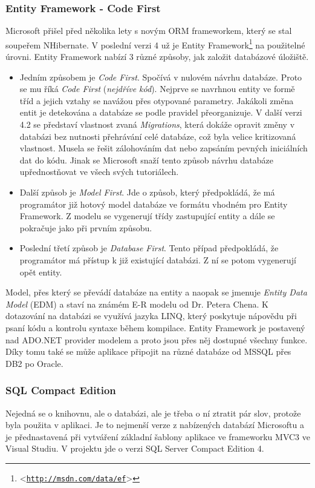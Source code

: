 \documentclass[11pt,twoside,a4paper]{book}
\let\oldUrl\url
\renewcommand\url[1]{<\texttt{\oldUrl{#1}}>}
\begin{document}
\subsubsection{Entity Framework - Code First}
\label{sec:ef}
Microsoft přišel před několika lety s novým ORM frameworkem, který se stal soupeřem NHibernate. V poslední verzi 4 už je Entity Framework\footnote{\url{http://msdn.com/data/ef}} na použitelné úrovni. Entity Framework nabízí 3 různé způsoby, jak založit databázové úložiště. 

\begin{itemize}
\item Jedním způsobem je \textit{Code First}. Spočívá v nulovém návrhu databáze. Proto se mu říká \textit{Code First} (\textit{nejdříve kód}). Nejprve se navrhnou entity ve formě tříd a jejich vztahy se navážou přes otypované parametry. Jakákoli změna entit je detekována a databáze se podle pravidel přeorganizuje. V další verzi 4.2 se představí vlastnost zvaná \textit{Migrations}, která dokáže opravit změny v databázi bez nutnosti přehrávání celé databáze, což byla velice kritizovaná vlastnost. Musela se řešit zálohováním dat nebo zapsáním pevných iniciálních dat do kódu. Jinak se Microsoft snaží tento způsob návrhu databáze upřednostňovat ve všech svých tutoriálech.

\item Další způsob je \textit{Model First}. Jde o způsob, který předpokládá, že má programátor již hotový model databáze ve formátu vhodném pro Entity Framework. Z modelu se vygenerují třídy zastupující entity a dále se pokračuje jako při prvním způsobu. 

\item Poslední třetí způsob je \textit{Database First}. Tento případ předpokládá, že programátor má přístup k již existující databázi. Z ní se potom vygenerují opět entity.

\end{itemize}

Model, přes který se převádí databáze na entity a naopak se jmenuje \textit{Entity Data Model} (EDM) a staví na známém E-R modelu od Dr. Petera Chena. K dotazování na databázi se využívá jazyka LINQ, který poskytuje nápovědu při psaní kódu a kontrolu syntaxe během kompilace. Entity Framework je postavený nad ADO.NET provider modelem a proto jsou přes něj dostupné všechny funkce. Díky tomu také se může aplikace připojit na různé databáze od MSSQL přes DB2 po Oracle\cite{efintro}.


\subsubsection{SQL Compact Edition}
Nejedná se o knihovnu, ale o databázi, ale je třeba o ní ztratit pár slov, protože byla použita v aplikaci. Je to nejmenší verze z nabízených databází Microsoftu a je přednastavená při vytváření základní šablony aplikace ve frameworku MVC3 ve Visual Studiu. V projektu jde o verzi SQL Server Compact Edition 4.
\end{document}
